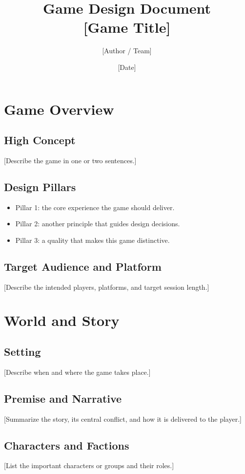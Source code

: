 \documentclass[11pt,a4paper]{article}
\title{Game Design Document\\[0.5em]\large [Game Title]}
\author{[Author / Team]}
\date{[Date]}
\begin{document}
\maketitle
\tableofcontents
\newpage

\section{Game Overview}
\subsection{High Concept}
[Describe the game in one or two sentences.]

\subsection{Design Pillars}
\begin{itemize}
    \item Pillar 1: the core experience the game should deliver.
    \item Pillar 2: another principle that guides design decisions.
    \item Pillar 3: a quality that makes this game distinctive.
\end{itemize}

\subsection{Target Audience and Platform}
[Describe the intended players, platforms, and target session length.]

\section{World and Story}
\subsection{Setting}
[Describe when and where the game takes place.]

\subsection{Premise and Narrative}
[Summarize the story, its central conflict, and how it is delivered to the player.]

\subsection{Characters and Factions}
[List the important characters or groups and their roles.]
\end{document}
